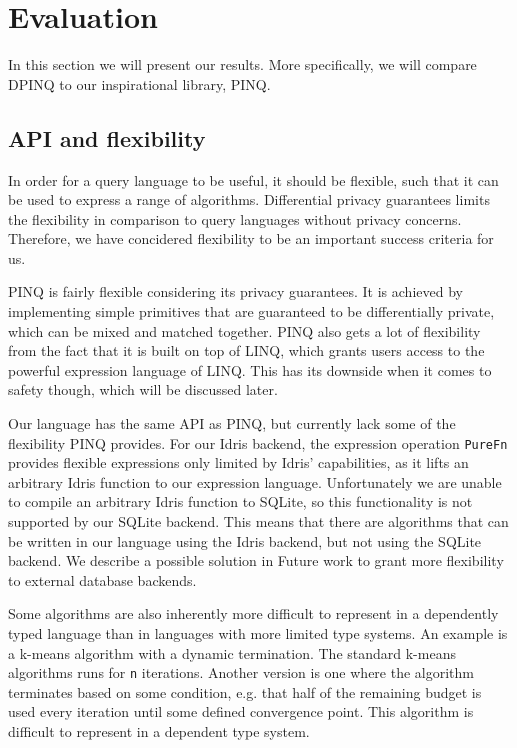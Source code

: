 \documentclass[12pt]{article}
\begin{document}
\section{Evaluation}\label{sec:evaluation}

In this section we will present our results.
More specifically, we will compare DPINQ to our inspirational library, PINQ.

\subsection{API and flexibility}

In order for a query language to be useful, it should be flexible, such that it can be used to express a range of algorithms.
Differential privacy guarantees limits the flexibility in comparison to query languages without privacy concerns.
Therefore, we have concidered flexibility to be an important success criteria for us.

PINQ is fairly flexible considering its privacy guarantees.
It is achieved by implementing simple primitives that are guaranteed to be differentially private, which can be mixed and matched together.
PINQ also gets a lot of flexibility from the fact that it is built on top of LINQ, which grants users access to the powerful expression language of LINQ.
This has its downside when it comes to safety though, which will be discussed later.

Our language has the same API as PINQ, but currently lack some of the flexibility PINQ provides.
For our Idris backend, the expression operation \texttt{PureFn} provides flexible expressions only limited by Idris' capabilities, as it lifts an arbitrary Idris function to our expression language.
Unfortunately we are unable to compile an arbitrary Idris function to SQLite, so this functionality is not supported by our SQLite backend.
This means that there are algorithms that can be written in our language using the Idris backend, but not using the SQLite backend.
We describe a possible solution in Future work to grant more flexibility to external database backends.

Some algorithms are also inherently more difficult to represent in a dependently typed language than in languages with more limited type systems.
An example is a k-means algorithm with a dynamic termination.
The standard k-means algorithms runs for \texttt{n} iterations.
Another version is one where the algorithm terminates based on some condition, e.g. that half of the remaining budget is used every iteration until some defined convergence point.
This algorithm is difficult to represent in a dependent type system.
\end{document}
